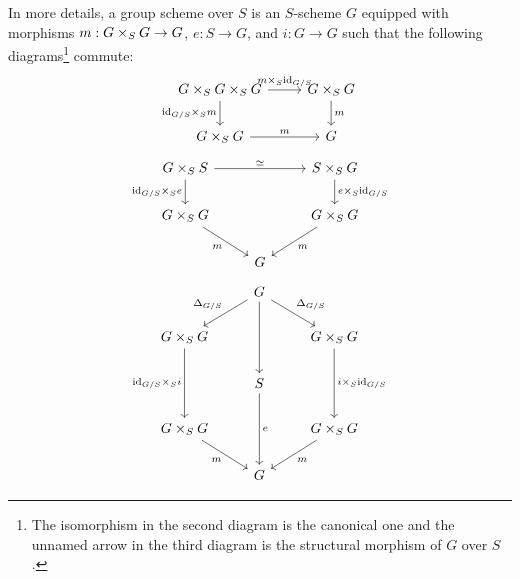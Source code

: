\begin{definition}
                In more details, a group scheme over $S$ is an $S$-scheme $G$ equipped with morphisms $m: G \x_S G \to G$, $e: S \to G$, and $i: G \to G$ such that the following diagrams\footnote{The isomorphism in the second diagram is the canonical one and the unnamed arrow in the third diagram is the structural morphism of $G$ over $S$.} commute:
                    $$
                        \begin{tikzcd}
                        	{G \x_S G \x_S G} & {G \x_S G} \\
                        	{G \x_S G} & G
                        	\arrow["{\id_{G/S} \x_S m}"', from=1-1, to=2-1]
                        	\arrow["m", from=2-1, to=2-2]
                        	\arrow["{m \x_S \id_{G/S}}", from=1-1, to=1-2]
                        	\arrow["m", from=1-2, to=2-2]
                        \end{tikzcd}
                    $$
                    $$
                        \begin{tikzcd}
                        	{G \x_S S} && {S \x_S G} \\
                        	{G \x_S G} && {G \x_S G} \\
                        	& G
                        	\arrow["m"', from=2-1, to=3-2]
                        	\arrow["{e \x_S \id_{G/S}}", from=1-3, to=2-3]
                        	\arrow["m", from=2-3, to=3-2]
                        	\arrow["{\id_{G/S} \x_S e}"', from=1-1, to=2-1]
                        	\arrow["\cong", from=1-1, to=1-3]
                        \end{tikzcd}
                    $$
                    $$
                        \begin{tikzcd}
                        	& G \\
                        	{G \x_S G} && {G \x_S G} \\
                        	& S \\
                        	{G \x_S G} && {G \x_S G} \\
                        	& G
                        	\arrow["m", from=4-3, to=5-2]
                        	\arrow["m"', from=4-1, to=5-2]
                        	\arrow["{\id_{G/S} \x_S i}"', from=2-1, to=4-1]
                        	\arrow["{i \x_S \id_{G/S}}", from=2-3, to=4-3]
                        	\arrow["{\Delta_{G/S}}"', from=1-2, to=2-1]
                        	\arrow["{\Delta_{G/S}}", from=1-2, to=2-3]
                        	\arrow["e", from=3-2, to=5-2]
                        	\arrow[from=1-2, to=3-2]

\end{tikzcd}$$
\end{definition}
